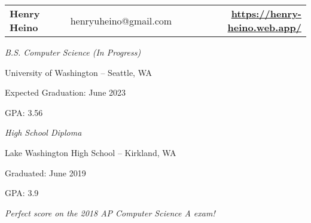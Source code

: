 \documentclass[12pt,letterpaper]{extarticle}
\begin{document}
  \setlength\parindent{0em}
  \begin{tabular}{lcr}
    {\huge \textbf{Henry Heino}} & henryuheino@gmail.com & {\large \textbf{\url{https://henry-heino.web.app/}}}
  \end{tabular}

  \qquad

  \emph{B.S. Computer Science (In Progress)}
  \begin{addmargin}[2em]{0em}
    \par University of Washington -- Seattle, WA
    \par Expected Graduation: June 2023
    \par GPA: 3.56
  \end{addmargin}

  \emph{High School Diploma}
  \begin{addmargin}[2em]{0em}
    \par Lake Washington High School -- Kirkland, WA
    \par Graduated: June 2019
    \par GPA: 3.9
    \par \emph{\footnotesize{Perfect score on the 2018 AP Computer Science A exam!}}
  \end{addmargin}
\end{document}
